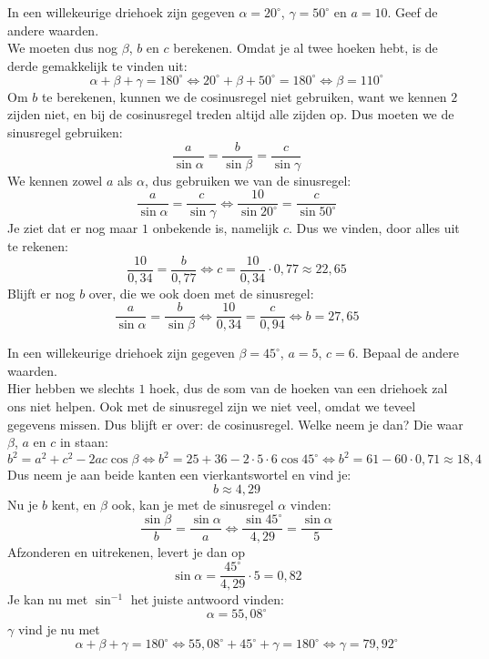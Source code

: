 \begin{voorbeeld}
	In een willekeurige driehoek zijn gegeven $\alpha=20^\circ$, $\gamma = 50^\circ$ en $a=10$. Geef de andere waarden.\\
We moeten dus nog $\beta$, $b$ en $c$ berekenen. Omdat je al twee hoeken hebt, is de derde gemakkelijk te vinden uit:
\[\alpha+\beta+\gamma=180^\circ\Leftrightarrow 20^\circ + \beta + 50^\circ=180^\circ \Leftrightarrow \beta = 110^\circ\]
Om $b$ te berekenen, kunnen we de cosinusregel niet gebruiken, want we kennen $2$ zijden niet, en bij de cosinusregel treden altijd alle zijden op. Dus moeten we de sinusregel gebruiken:
\[\frac{a}{\sin \alpha} = \frac{b}{\sin \beta} = \frac{c}{\sin \gamma}\]
We kennen zowel $a$ als $\alpha$, dus gebruiken we van de sinusregel:
\[\frac{a}{\sin \alpha} = \frac{c}{\sin \gamma}\Leftrightarrow \frac{10}{\sin 20^\circ}=\frac{c}{\sin 50^\circ}\]
Je ziet dat er nog maar $1$ onbekende is, namelijk $c$.  Dus we vinden, door alles uit te rekenen:
\[\frac{10}{0,34}=\frac{b}{0,77}\Leftrightarrow c= \frac{10}{0,34}\cdot 0,77 \approx 22,65\]
Blijft er nog $b$ over, die we ook doen met de sinusregel:
\[\frac{a}{\sin \alpha}=\frac{b}{\sin \beta}\Leftrightarrow \frac{10}{0,34}=\frac{c}{0,94}\Leftrightarrow b= 27,65\]
\end{voorbeeld}

\begin{voorbeeld}
	In een willekeurige driehoek zijn gegeven $\beta = 45^\circ$, $a = 5$, $c=6$. Bepaal de andere waarden.\\
Hier hebben we slechts $1$ hoek, dus de som van de hoeken van een driehoek zal ons niet helpen. Ook met de sinusregel zijn we niet veel, omdat we teveel gegevens missen. Dus blijft er over: de cosinusregel. Welke neem je dan? Die waar $\beta$, $a$ en $c$ in staan:
\[b^2=a^2+c^2-2ac\cos\beta \Leftrightarrow b^2 = 25+36-2\cdot5\cdot 6\cos 45^\circ \Leftrightarrow b^2 = 61-60 \cdot 0,71 \approx 18,4\]
Dus neem je aan beide kanten een vierkantswortel en vind je:
\[b \approx 4,29\]
Nu je $b$ kent, en $\beta$ ook, kan je met de sinusregel $\alpha$ vinden:
\[\frac{\sin \beta}{b}=\frac{\sin \alpha}{a}\Leftrightarrow \frac{\sin 45^\circ}{4,29}=\frac{\sin \alpha}{5}\]
Afzonderen en uitrekenen, levert je dan op
\[\sin \alpha = \frac{45^\circ}{4,29}\cdot 5 = 0,82\]
Je kan nu met $\sin^{-1}$ het juiste antwoord vinden:
\[\alpha=55,08^\circ\]
$\gamma$ vind je nu met
\[\alpha+\beta+\gamma=180^\circ\Leftrightarrow 55,08^\circ + 45^\circ + \gamma = 180^\circ \Leftrightarrow \gamma = 79,92^\circ\]
\end{voorbeeld}


